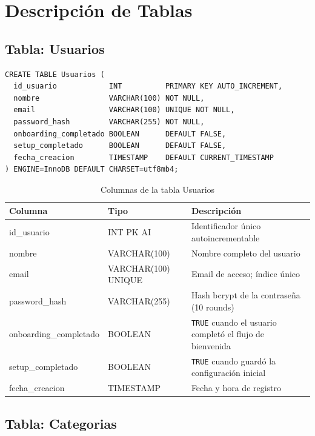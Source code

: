 \section{Descripción de Tablas}

\subsection{Tabla: Usuarios}

\begin{lstlisting}[style=sql, caption={DDL de la tabla Usuarios}, label={lst:tbl-usuarios}]
CREATE TABLE Usuarios (
  id_usuario            INT          PRIMARY KEY AUTO_INCREMENT,
  nombre                VARCHAR(100) NOT NULL,
  email                 VARCHAR(100) UNIQUE NOT NULL,
  password_hash         VARCHAR(255) NOT NULL,
  onboarding_completado BOOLEAN      DEFAULT FALSE,
  setup_completado      BOOLEAN      DEFAULT FALSE,
  fecha_creacion        TIMESTAMP    DEFAULT CURRENT_TIMESTAMP
) ENGINE=InnoDB DEFAULT CHARSET=utf8mb4;
\end{lstlisting}

\begin{longtable}{>{\ttfamily}p{4cm} >{\ttfamily}p{2.5cm} p{7cm}}
  \caption{Columnas de la tabla Usuarios}
  \label{tab:cols-usuarios} \\
  \toprule
  \textbf{Columna} & \textbf{Tipo} & \textbf{Descripción} \\
  \midrule
  id\_usuario            & INT PK AI  & Identificador único autoincrementable \\
  nombre                 & VARCHAR(100) & Nombre completo del usuario \\
  email                  & VARCHAR(100) UNIQUE & Email de acceso; índice único \\
  password\_hash         & VARCHAR(255) & Hash bcrypt de la contraseña (10 rounds) \\
  onboarding\_completado & BOOLEAN & \texttt{TRUE} cuando el usuario completó el flujo de bienvenida \\
  setup\_completado      & BOOLEAN & \texttt{TRUE} cuando guardó la configuración inicial \\
  fecha\_creacion        & TIMESTAMP & Fecha y hora de registro \\
  \bottomrule
\end{longtable}

\subsection{Tabla: Categorias}

